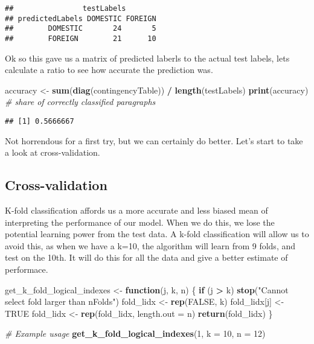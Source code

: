 \documentclass[
]{article}
\newenvironment{Shaded}{\begin{snugshade}}{\end{snugshade}}
\newcommand{\CommentTok}[1]{\textcolor[rgb]{0.56,0.35,0.01}{\textit{#1}}}
\newcommand{\ControlFlowTok}[1]{\textcolor[rgb]{0.13,0.29,0.53}{\textbf{#1}}}
\newcommand{\DataTypeTok}[1]{\textcolor[rgb]{0.13,0.29,0.53}{#1}}
\newcommand{\DecValTok}[1]{\textcolor[rgb]{0.00,0.00,0.81}{#1}}
\newcommand{\KeywordTok}[1]{\textcolor[rgb]{0.13,0.29,0.53}{\textbf{#1}}}
\newcommand{\NormalTok}[1]{#1}
\newcommand{\OperatorTok}[1]{\textcolor[rgb]{0.81,0.36,0.00}{\textbf{#1}}}
\newcommand{\OtherTok}[1]{\textcolor[rgb]{0.56,0.35,0.01}{#1}}
\newcommand{\StringTok}[1]{\textcolor[rgb]{0.31,0.60,0.02}{#1}}
\begin{document}
\begin{verbatim}
##                testLabels
## predictedLabels DOMESTIC FOREIGN
##        DOMESTIC       24       5
##        FOREIGN        21      10
\end{verbatim}

Ok so this gave us a matrix of predicted laberls to the actual test
labels, lets calculate a ratio to see how accurate the prediction was.

\begin{Shaded}
\begin{Highlighting}[]
\NormalTok{accuracy <-}\StringTok{ }\KeywordTok{sum}\NormalTok{(}\KeywordTok{diag}\NormalTok{(contingencyTable)) }\OperatorTok{/}\StringTok{ }\KeywordTok{length}\NormalTok{(testLabels)}
\KeywordTok{print}\NormalTok{(accuracy) }\CommentTok{# share of correctly classified paragraphs}
\end{Highlighting}
\end{Shaded}

\begin{verbatim}
## [1] 0.5666667
\end{verbatim}

Not horrendous for a first try, but we can certainly do better. Let's
start to take a look at cross-validation.

\hypertarget{cross-validation}{%
\subsection{Cross-validation}\label{cross-validation}}

K-fold classification affords us a more accurate and less biased mean of
interpreting the performance of our model. When we do this, we lose the
potential learning power from the test data. A k-fold classification
will allow us to avoid this, as when we have a k=10, the algorithm will
learn from 9 folds, and test on the 10th. It will do this for all the
data and give a better estimate of performace.

\begin{Shaded}
\begin{Highlighting}[]
\NormalTok{get_k_fold_logical_indexes <-}\StringTok{ }\ControlFlowTok{function}\NormalTok{(j, k, n) \{}
  \ControlFlowTok{if}\NormalTok{ (j }\OperatorTok{>}\StringTok{ }\NormalTok{k) }\KeywordTok{stop}\NormalTok{(}\StringTok{"Cannot select fold larger than nFolds"}\NormalTok{)}
\NormalTok{  fold_lidx <-}\StringTok{ }\KeywordTok{rep}\NormalTok{(}\OtherTok{FALSE}\NormalTok{, k)}
\NormalTok{  fold_lidx[j] <-}\StringTok{ }\OtherTok{TRUE}
\NormalTok{  fold_lidx <-}\StringTok{ }\KeywordTok{rep}\NormalTok{(fold_lidx, }\DataTypeTok{length.out =}\NormalTok{ n)}
  \KeywordTok{return}\NormalTok{(fold_lidx)}
\NormalTok{\}}

\CommentTok{# Example usage}
\KeywordTok{get_k_fold_logical_indexes}\NormalTok{(}\DecValTok{1}\NormalTok{, }\DataTypeTok{k =} \DecValTok{10}\NormalTok{, }\DataTypeTok{n =} \DecValTok{12}\NormalTok{)}
\end{Highlighting}
\end{Shaded}
\end{document}
